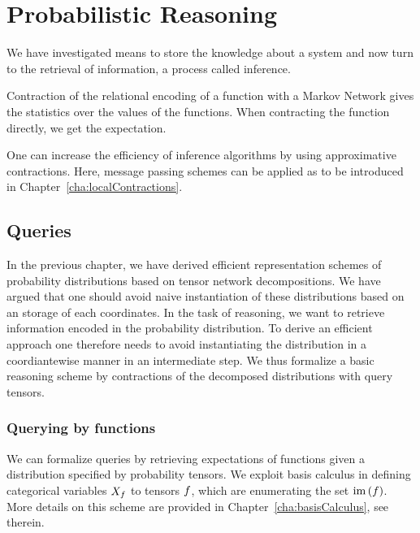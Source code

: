 \section{Probabilistic Reasoning}\label{cha:probReasoning} 

We have investigated means to store the knowledge about a system and now turn to the retrieval of information, a process called inference.

% 
Contraction of the relational encoding of a function with a Markov Network gives the statistics over the values of the functions.
When contracting the function directly, we get the expectation.

One can increase the efficiency of inference algorithms by using approximative contractions.
Here, message passing schemes can be applied as to be introduced in Chapter~\ref{cha:localContractions}.


\subsection{Queries}

In the previous chapter, we have derived efficient representation schemes of probability distributions based on tensor network decompositions.
We have argued that one should avoid naive instantiation of these distributions based on an storage of each coordinates.
In the task of reasoning, we want to retrieve information encoded in the probability distribution.
To derive an efficient approach one therefore needs to avoid instantiating the distribution in a coordiantewise manner in an intermediate step.
We thus formalize a basic reasoning scheme by contractions of the decomposed distributions with query tensors.

\subsubsection{Querying by functions}

We can formalize queries by retrieving expectations of functions given a distribution specified by probability tensors. 
We exploit basis calculus in defining categorical variables $X_{f}$ to tensors $f$, which are enumerating the set $\mathrm{im}\left(f\right)$.
More details on this scheme are provided in Chapter~\ref{cha:basisCalculus}, see  therein.

